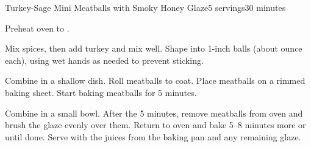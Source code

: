 \documentclass[../Cookbook.tex]{subfiles}
\begin{document}
\begin{recipe}{Turkey-Sage Mini Meatballs with Smoky Honey Glaze}{5 servings}{30 minutes}

Preheat oven to .

Mix spices, then add turkey and mix well. Shape into 1-inch balls (about  ounce each), using wet hands as needed to prevent sticking.

Combine in a shallow dish. Roll meatballs to coat. Place meatballs on a rimmed baking sheet.
Start baking meatballs for 5 minutes.

Combine in a small bowl. After the 5 minutes, remove meatballs from oven and brush the glaze evenly over them. Return to oven and bake 5--8 minutes more or until done. Serve with the juices from the baking pan and any remaining glaze.

\end{recipe}
\end{document}
